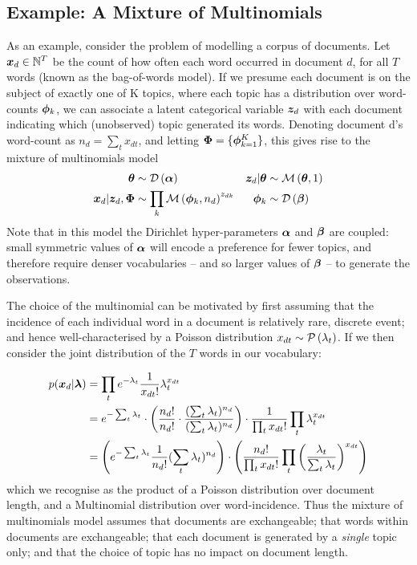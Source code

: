 \subsection*{Example: A Mixture of Multinomials}
\label{sec:ch1:mom}
As an example, consider the problem of modelling a corpus of documents. Let ${ \bm x_d } \in \mathbb{N}^T$ be the count of how often each word occurred in document $d$, for all $T$ words (known as the bag-of-words model). If we presume each document is on the subject of exactly one of K topics, where each topic has a distribution over word-counts $\bm \phi_k$, we can associate a latent categorical variable $\bm z_d$ with each document indicating which (unobserved) topic generated its words. Denoting document d's word-count as $n_d = \sum_t x_{dt}$, and letting ${ \bm \Phi } = \{ \bm \phi_{k=1}^K \}$, this gives rise to the mixture of multinomials model\cite{Nigam2000}
\begin{align}
\bm \theta & \sim \mathcal{D} \left( {\bm \alpha} \right) &
{ \bm z_d }|\bm \theta & \sim \mathcal{M} \left( {\bm \theta},{1} \right) \\
{ \bm x_d }|{ \bm z_d }, { \bm \Phi } & \sim \prod_k \mathcal{M} \left( {{ \bm \phi }_k},{n_d} \right)^{z_{dk}} & 
{ \bm \phi }_k & \sim \mathcal{D} \left( {\bm \beta} \right)
\end{align}
Note that in this model the Dirichlet hyper-parameters $\bm \alpha$ and $\bm \beta$ are coupled: small symmetric values of $\bm \alpha$ will encode a preference for fewer topics, and therefore require denser vocabularies -- and so larger values of $\bm \beta$ -- to generate the observations. 

The choice of the multinomial can be motivated by first assuming that the incidence of each individual word in a document is relatively rare, discrete event; and hence well-characterised by a Poisson distribution $x_{dt} \sim \mathcal{P} \left( {\lambda_t} \right)$. If we then consider the joint distribution of the $T$ words in our vocabulary:

\begin{align}
\begin{split}
p({ \bm x_d }|\bm \lambda) 
& = \prod_t e^{-\lambda_t} \frac{1}{ {x_{dt} !} } \lambda_t^{x_{dt}} \\
& = e^{-\sum_t \lambda_t} \cdot \left(
    \frac{n_d !}{n_d !}
    \cdot
    \frac{(\sum_t \lambda_t)^{n_d}}{(\sum_t \lambda_t)^{n_d}} 
    \right)
    \cdot \frac{1}{\prod_t x_{dt} !}\prod_t \lambda_t^{x_{dt}} \\
& = \left(e^{-\sum_t \lambda_t} \frac{1}{ {n_d !} } (\sum_t \lambda_t)^{n_d}\right)
    \cdot
    \left(\frac{n_d!}{\prod_t x_{dt} !} \prod_t \left(\frac{\lambda_t}{\sum_t \lambda_t}\right)^{x_{dt}}\right)
\end{split}
\end{align}
which we recognise as the product of a Poisson distribution over document length, and a Multinomial distribution over word-incidence. Thus the mixture of multinomials model assumes that documents are exchangeable; that words within documents are exchangeable; that each document is generated by a \emph{single} topic only; and that the choice of topic has no impact on document length.

